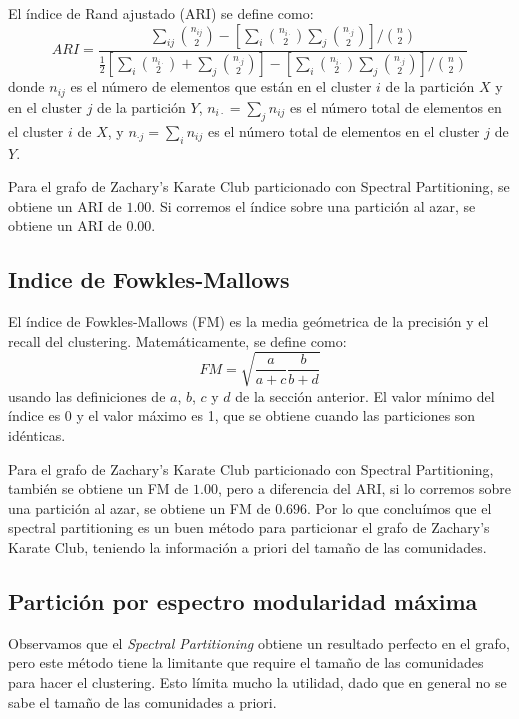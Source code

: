 \documentclass{article}
\begin{document}
El índice de Rand ajustado (ARI) se define como:
\begin{equation}
    ARI = \frac{\sum_{ij} \binom{n_{ij}}{2} - \left[\sum_i \binom{n_{i\cdot}}{2} \sum_j \binom{n_{\cdot j}}{2}\right] / \binom{n}{2}}{\frac{1}{2}\left[\sum_i \binom{n_{i\cdot}}{2} + \sum_j \binom{n_{\cdot j}}{2}\right] - \left[\sum_i \binom{n_{i\cdot}}{2} \sum_j \binom{n_{\cdot j}}{2}\right] / \binom{n}{2}}
\end{equation}
donde $n_{ij}$ es el número de elementos que están en el cluster $i$ de la partición $X$ y en el cluster $j$ de la partición $Y$, $n_{i\cdot} = \sum_j n_{ij}$ es el número total de elementos en el cluster $i$ de $X$, y $n_{\cdot j} = \sum_i n_{ij}$ es el número total de elementos en el cluster $j$ de $Y$.

Para el grafo de Zachary's Karate Club particionado con Spectral Partitioning, se obtiene un ARI de $1.00$. Si corremos el índice sobre una partición al azar, se obtiene un ARI de $0.00$.

\subsection{Indice de Fowkles-Mallows}

El índice de Fowkles-Mallows (FM) es la media geómetrica de la precisión y el recall del clustering. Matemáticamente, se define como:
\begin{equation}
    FM = \sqrt{\frac{a}{a+c}\frac{b}{b+d}}
\end{equation}
usando las definiciones de $a$, $b$, $c$ y $d$ de la sección anterior. El valor mínimo del índice es 0 y el valor máximo es 1, que se obtiene cuando las particiones son idénticas. 

Para el grafo de Zachary's Karate Club particionado con Spectral Partitioning, también se obtiene un FM de $1.00$, pero a diferencia del ARI, si lo corremos sobre una partición al azar, se obtiene un FM de $0.696$. Por lo que concluímos que el spectral partitioning es un buen método para particionar el grafo de Zachary's Karate Club, teniendo la información a priori del tamaño de las comunidades.

\subsection{Partición por espectro modularidad máxima}

Observamos que el \emph{Spectral Partitioning} obtiene un resultado perfecto en el grafo, pero este método tiene la limitante que require el tamaño de las comunidades para hacer el clustering. Esto límita mucho la utilidad, dado que en general no se sabe el tamaño de las comunidades a priori.
\end{document}
